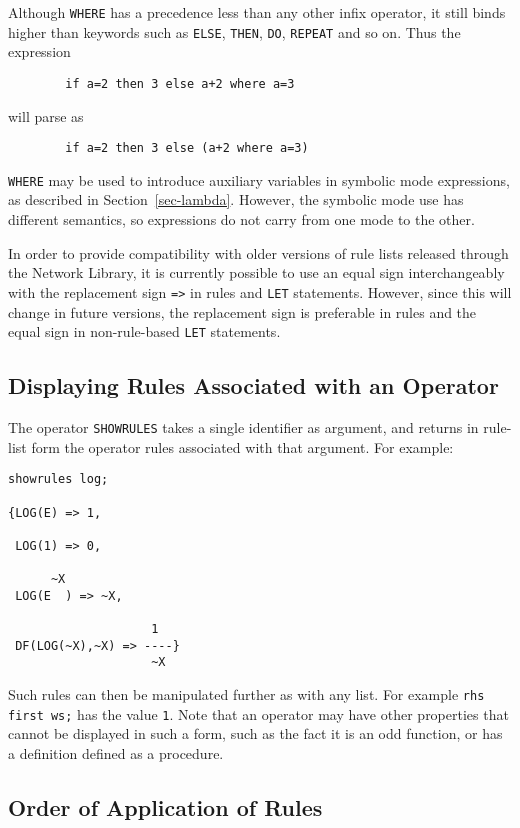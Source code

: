 Although {\tt WHERE} has a precedence less than any other infix operator,
it still binds higher than keywords such as {\tt ELSE}, {\tt THEN},
{\tt DO}, {\tt REPEAT} and so on.  Thus the expression
\begin{verbatim}
        if a=2 then 3 else a+2 where a=3
\end{verbatim}
will parse as
\begin{verbatim}
        if a=2 then 3 else (a+2 where a=3)
\end{verbatim}

{\tt WHERE} may be used to introduce auxiliary variables in symbolic mode
expressions, as described in Section~\ref{sec-lambda}.  However, the
symbolic mode use has different semantics, so expressions do not carry
from one mode to the other.

\COMPATNOTE In order to provide compatibility with older versions of rule
lists released through the Network Library, it is currently possible to use
an equal sign interchangeably with the replacement sign {\tt =>} in rules
and {\tt LET} statements.  However, since this will change in future
versions, the replacement sign is preferable in rules and the equal sign
in non-rule-based {\tt LET} statements.

\subsection*{Displaying Rules Associated with an Operator}

The operator {\tt SHOWRULES} takes a single identifier
as argument, and returns in rule-list form the operator rules associated
with that argument.  For example:
\begin{verbatim}
showrules log;

{LOG(E) => 1,

 LOG(1) => 0,

      ~X
 LOG(E  ) => ~X,

                    1
 DF(LOG(~X),~X) => ----}
                    ~X
\end{verbatim}

Such rules can then be manipulated further as with any list.  For example
{\tt rhs first ws;} has the value {\tt 1}.  Note that an operator may
have other properties that cannot be displayed in such a form, such as the
fact it is an odd function, or has a definition defined as a procedure.

\subsection*{Order of Application of Rules}

